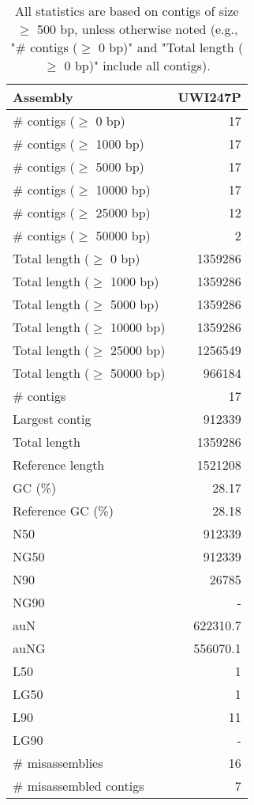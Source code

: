 \documentclass[12pt,a4paper]{article}
\begin{document}
\begin{table}[ht]
\begin{center}
\caption{All statistics are based on contigs of size $\geq$ 500 bp, unless otherwise noted (e.g., "\# contigs ($\geq$ 0 bp)" and "Total length ($\geq$ 0 bp)" include all contigs).}
\begin{tabular}{|l*{1}{|r}|}
\hline
Assembly & UWI247P \\ \hline
\# contigs ($\geq$ 0 bp) & 17 \\ \hline
\# contigs ($\geq$ 1000 bp) & 17 \\ \hline
\# contigs ($\geq$ 5000 bp) & 17 \\ \hline
\# contigs ($\geq$ 10000 bp) & 17 \\ \hline
\# contigs ($\geq$ 25000 bp) & 12 \\ \hline
\# contigs ($\geq$ 50000 bp) & 2 \\ \hline
Total length ($\geq$ 0 bp) & 1359286 \\ \hline
Total length ($\geq$ 1000 bp) & 1359286 \\ \hline
Total length ($\geq$ 5000 bp) & 1359286 \\ \hline
Total length ($\geq$ 10000 bp) & 1359286 \\ \hline
Total length ($\geq$ 25000 bp) & 1256549 \\ \hline
Total length ($\geq$ 50000 bp) & 966184 \\ \hline
\# contigs & 17 \\ \hline
Largest contig & 912339 \\ \hline
Total length & 1359286 \\ \hline
Reference length & 1521208 \\ \hline
GC (\%) & 28.17 \\ \hline
Reference GC (\%) & 28.18 \\ \hline
N50 & 912339 \\ \hline
NG50 & 912339 \\ \hline
N90 & 26785 \\ \hline
NG90 & - \\ \hline
auN & 622310.7 \\ \hline
auNG & 556070.1 \\ \hline
L50 & 1 \\ \hline
LG50 & 1 \\ \hline
L90 & 11 \\ \hline
LG90 & - \\ \hline
\# misassemblies & 16 \\ \hline
\# misassembled contigs & 7 \\ \hline

\end{tabular}
\end{center}
\end{table}
\end{document}
